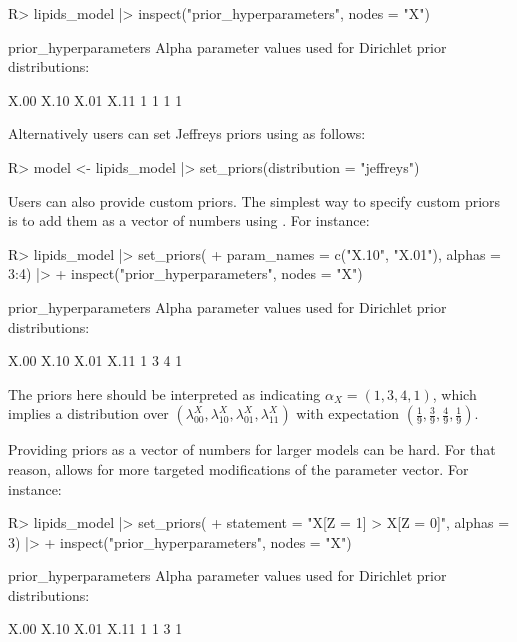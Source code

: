 \documentclass[
  11pt,
  article]{jss}
\renewcommand{\texttt}[1]{\code{#1}}
\begin{document}
\begin{CodeChunk}
\begin{CodeInput}
R> lipids_model |> inspect("prior_hyperparameters", nodes = "X") 
\end{CodeInput}

\begin{CodeOutput}

prior_hyperparameters
Alpha parameter values used for Dirichlet prior distributions:

X.00 X.10 X.01 X.11 
   1    1    1    1 
\end{CodeOutput}
\end{CodeChunk}

Alternatively users can set Jeffreys priors using \texttt{set\_priors()}
as follows:

\begin{CodeInput}
R> model <- lipids_model |> set_priors(distribution = "jeffreys")
\end{CodeInput}

Users can also provide custom priors. The simplest way to specify custom
priors is to add them as a vector of numbers using
\texttt{set\_priors()}. For instance:

\begin{CodeChunk}
\begin{CodeInput}
R> lipids_model |> set_priors(
+    param_names = c("X.10", "X.01"), alphas = 3:4) |> 
+    inspect("prior_hyperparameters", nodes = "X")
\end{CodeInput}

\begin{CodeOutput}

prior_hyperparameters
Alpha parameter values used for Dirichlet prior distributions:

X.00 X.10 X.01 X.11 
   1    3    4    1 
\end{CodeOutput}
\end{CodeChunk}

The priors here should be interpreted as indicating
\(\alpha_X = (1, 3, 4, 1)\), which implies a distribution over
\((\lambda^X_{00},\lambda^X_{10}, \lambda^X_{01}, \lambda^X_{11})\) with
expectation
\(\left(\frac{1}{9}, \frac{3}{9}, \frac{4}{9}, \frac{1}{9} \right)\).

Providing priors as a vector of numbers for larger models can be hard.
For that reason, \texttt{set\_priors()} allows for more targeted
modifications of the parameter vector. For instance:

\begin{CodeChunk}
\begin{CodeInput}
R> lipids_model |> set_priors(
+    statement = "X[Z = 1] > X[Z = 0]", alphas = 3) |>
+    inspect("prior_hyperparameters", nodes = "X")
\end{CodeInput}

\begin{CodeOutput}

prior_hyperparameters
Alpha parameter values used for Dirichlet prior distributions:

X.00 X.10 X.01 X.11 
   1    1    3    1 
\end{CodeOutput}
\end{CodeChunk}
\end{document}

